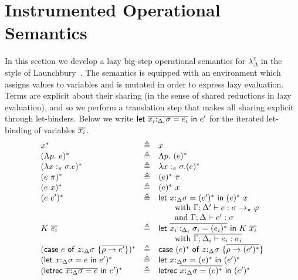 \documentclass[acmsmall,review,anonymous,screen]{acmart}
\newcommand{\llet}[2]{\mathsf{let}~#1~\mathsf{in}~#2}
\newcommand{\lletrec}[2]{\mathsf{letrec}~#1~\mathsf{in}~#2}
\newcommand{\ccase}[2]{\mathsf{case}~#1~\mathsf{of}~#2}
\begin{document}



\section{Instrumented Operational Semantics}\label{app:opsem}

In this section we develop a lazy big-step operational semantics for $\lambda_\Delta^\pi$ in the
style of Launchbury~\cite{10.1145/158511.158618}. The semantics is
equipped with an environment which assigns values to variables and is
mutated in order to express lazy evaluation. Terms are explicit about
their sharing (in the sense of shared reductions in lazy evaluation),
and so we perform a translation step that makes all sharing explicit
through let-binders.
Below we write $\llet{\ov{x_i{:}_{\Delta_i}\sigma = e_i}}{e'}$ for the iterated
let-binding of variables $\overline{x_i}$.
\[
  \begin{array}{lclr}
    x^* & \triangleq & x\\

    (\Lambda p.~e)^* & \triangleq & \Lambda p.~(e)^*\\
    (\lambda x:_\pi\sigma .e)^* & \triangleq & \lambda x:_\pi\sigma . (e)^*\\
    (e~\pi)^* & \triangleq & (e)^*~\pi\\
    (e~x)^* & \triangleq & (e)^*~x\\
    (e~e')^* & \triangleq & \llet{x{:}_{\Delta}\sigma =
                            (e')^*}{(e)^*~x}     \\ &&\qquad \mbox{with
                            $\Gamma;\Delta' \vdash e :
                            \sigma\rightarrow_\pi \varphi$} \\ &&\qquad \mbox{and
                                       $\Gamma;\Delta \vdash e' : \sigma$}\\
      K~\ov{e_i} & \triangleq & \llet{\ov{x_i:_{\Delta_i} \sigma_i =
                                   (e_i)^*}}{K~\ov{x_i}} \\ &&
                                       \qquad\mbox{with
                                       $\ov{\Gamma;\Delta_i\vdash
                                       e_i :
                                       \sigma_i}$}\\                                              
(\ccase{e}{z{:}_{\Delta}\sigma~\{\overline{\rho\to e'}\}})^* &
                                                               \triangleq
                                &
                                  \ccase{(e)^*}{z{:}_{\Delta}\sigma~\{\overline{\rho\to (e')^*}\}}\\
    (\llet{x{:}_{\Delta}\sigma = e}{e'}      )^* & \triangleq & \llet{x{:}_{\Delta}\sigma  = (e)^*}{(e')^*}    \\
    (\lletrec{\overline{x{:}_{\Delta}\sigma = e}}{e'}  )^* & \triangleq &\lletrec{\overline{x{:}_{\Delta}\sigma = (e)^*}}{(e')^*}  
      \end{array}
\]
\end{document}
